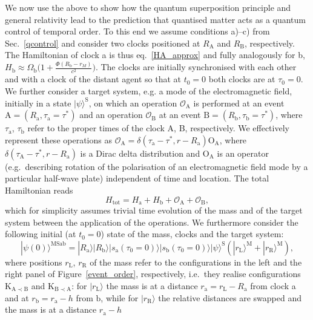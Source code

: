 \documentclass[a4paper,11pt]{article}
\newcommand{\ket}{\rangle}
\newcommand{\be}{\begin{equation}}
\newcommand{\ee}[1]{\label{#1} \end{equation}}
\begin{document}
We now use the above to show how the quantum superposition principle and general relativity lead to the prediction that quantised matter acts as a quantum control of temporal order. To this end we assume conditions a)--c) from Sec.~\ref{qcontrol}  and consider two clocks  positioned at $R_\mathrm{A}$ and $R_\mathrm{B}$, respectively. The Hamiltonian of clock a is thus eq.~\eqref{HA_approx} and fully analogously for b, $H_\mathrm{b}\approx \Omega_\mathrm{b}\big(1+\frac{\Phi(R_\mathrm{b}-r_M)}{c^2}\big)$. The clocks are initially synchronised with each other and with a clock of the distant agent so that at $t_0=0$ both clocks are at $\tau_0=0$. We further consider a target system, e.g. a mode of the electromagnetic field, initially in a state $|\psi\ket^\mathrm{S}$, on which an operation $\mathcal{O}_\mathrm{A}$ is performed  at an event $\mathrm A=(R_\mathrm{a}, \tau_\mathrm{a}=\tau^*)$ and an operation $\mathcal{O}_\mathrm{B}$ at an event $\mathrm{B}=(R_\mathrm{b}, \tau_\mathrm{b}=\tau^*)$, where $\tau_\mathrm{a}$, $\tau_\mathrm{b}$ refer to the proper {times} of the clock A, B, respectively. We effectively represent these operations as $\mathcal{O}_\mathrm{A}=\delta(\tau_\mathrm{a}-\tau^*, r-R_\mathrm{a})\mathrm{O_A}$, where $\delta(\tau_\mathrm{A}-\tau^*, r-R_\mathrm{a})$ is a Dirac delta distribution and $\mathrm{O_A}$ is an operator (e.g.~describing rotation of the polarisation of an electromagnetic field mode by a particular half-wave plate) independent of time and location.  The total Hamiltonian reads
 \be
H_\mathrm{tot}=H_\mathrm{a}+H_\mathrm{b}+\mathcal{O}_\mathrm{A}+\mathcal{O}_\mathrm{B},
 \ee{totalHam}
which for simplicity assumes trivial time evolution of the mass and of the target system between the application of the operations. We  furthermore consider the following initial (at $t_0=0$) state of the mass, clocks and the target system:
\be
|\psi(0)\ket^\mathrm{MSab}=|R_\mathrm{a}\ket|R_\mathrm{b}\ket|s_\mathrm{a}(\tau_0=0)\ket|s_\mathrm{b}(\tau_0=0)\ket|\psi\ket^\mathrm{S}\left(|r_\mathrm{L}\ket^\mathrm{M} + |r_\mathrm{R}\ket^\mathrm{M}\right),
\ee{joint_instate}
where positions $r_\mathrm{L}$, $r_\mathrm{R}$ of the mass refer to the configurations in the left and the right panel of Figure~\ref{event_order}, respectively, i.e.~they realise configurations $\mathrm{K_{A\prec B}}$ and $\mathrm{K_{B\prec A}}$: for $|r_\mathrm{L}\ket$ the mass is at a distance $r_\mathrm{a}=r_\mathrm{L}-R_\mathrm{a}$ from clock a and at $r_\mathrm{b}=r_\mathrm{a}-h$ from $\mathrm b$, while for $|r_\mathrm{R}\ket$  the relative distances are swapped and the mass is at a distance $r_\mathrm{a}-h$ %
\end{document}
